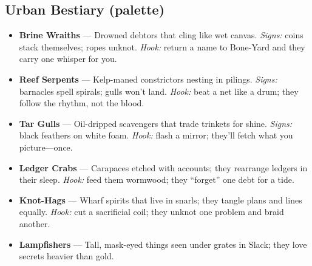 \subsection*{Urban Bestiary (palette)}
\begin{itemize}
  \item \textbf{Brine Wraiths} — Drowned debtors that cling like wet canvas. \emph{Signs:} coins stack themselves; ropes unknot. \emph{Hook:} return a name to Bone-Yard and they carry one whisper for you.
  \item \textbf{Reef Serpents} — Kelp-maned constrictors nesting in pilings. \emph{Signs:} barnacles spell spirals; gulls won’t land. \emph{Hook:} beat a net like a drum; they follow the rhythm, not the blood.
  \item \textbf{Tar Gulls} — Oil-dripped scavengers that trade trinkets for shine. \emph{Signs:} black feathers on white foam. \emph{Hook:} flash a mirror; they’ll fetch what you picture—once.
  \item \textbf{Ledger Crabs} — Carapaces etched with accounts; they rearrange ledgers in their sleep. \emph{Hook:} feed them wormwood; they “forget” one debt for a tide.
  \item \textbf{Knot-Hags} — Wharf spirits that live in snarls; they tangle plans and lines equally. \emph{Hook:} cut a sacrificial coil; they unknot one problem and braid another.
  \item \textbf{Lampfishers} — Tall, mask-eyed things seen under grates in Slack; they love secrets heavier than gold.
\end{itemize}

